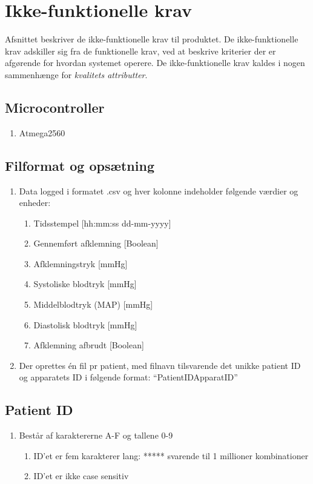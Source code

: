 	\chapter{Ikke-funktionelle krav}
	Afsnittet beskriver de ikke-funktionelle krav til produktet. De ikke-funktionelle krav adskiller sig fra de funktionelle krav, ved at beskrive kriterier der er afgørende for hvordan systemet operere. De ikke-funktionelle krav kaldes i nogen sammenhænge for \textit{kvalitets attributter}. 
	
	\section{Microcontroller}
	\begin{enumerate}
		\setlength\itemsep{0cm}
		\item Atmega2560
		\end{enumerate}
	
	\section{Filformat og opsætning}
	\begin{enumerate}
		\setlength\itemsep{0cm} %
		\item Data logged i formatet .csv og hver kolonne indeholder følgende værdier og enheder: 
		\begin{enumerate}
			\item Tidsstempel [hh:mm:ss dd-mm-yyyy]
			\item Gennemført afklemning [Boolean]
			\item Afklemningstryk [mmHg]
			\item Systoliske blodtryk [mmHg]
			\item Middelblodtryk (MAP) [mmHg]
			\item Diastolisk blodtryk [mmHg]
			\item Afklemning afbrudt [Boolean]
		\end{enumerate}
		\item Der oprettes én fil pr patient, med filnavn tilsvarende det unikke patient ID og apparatets ID i følgende format: “PatientIDApparatID”
	\end{enumerate}
	
	\section{Patient ID}
	\begin{enumerate}
		\setlength\itemsep{0cm} %
		\item Består af karaktererne A-F og tallene 0-9
		\begin{enumerate}
			\item ID’et er fem karakterer lang: ***** svarende til 1 millioner kombinationer
			\item ID’et er ikke case sensitiv
		\end{enumerate}
	\end{enumerate}
	
